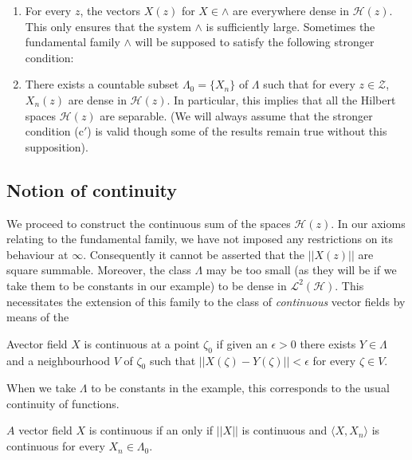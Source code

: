 \begin{enumerate}
\begin{enumerate}
\item For every $z$, the vectors $X(z)$ for $X\in \wedge$ are
  everywhere dense in $\mathscr{H}(z)$. This only ensures that the
  system $\wedge$ is sufficiently large. Sometimes the fundamental
  family $\wedge$ will be supposed to satisfy the following stronger
  condition: 

\setcounter{enumii}{2}
\renewcommand{\labelenumii}{(\theenumii$'$)}
\item There exists a countable subset $\Lambda_0 = \{X_n \}$
  of $\Lambda$ such that for every $z \in \mathcal{Z}$, $X_n (z)$ are
  dense in $\mathscr{H}(z)$. In particular, this implies that all the
  Hilbert spaces $\mathscr{H}(z)$ are separable. (We will always
  assume that the stronger condition (c$'$) is valid though some of
  the results remain true without this supposition). 
\end{enumerate}
\end{enumerate}

\subsection{Notion of continuity}\label{partIII-chap1-sec1.2}%

We proceed to construct the continuous sum of the spaces
$\mathscr{H}(z)$. In our axioms relating to the fundamental family, we
have not imposed any restrictions on its behaviour at
$\infty$. Consequently it cannot be asserted that the $|| X(z) ||$ are
square summable. Moreover, the class $\Lambda$ may be too small (as
they will be if we take them to be constants in our example) to be
dense in $\mathscr{L}^2(\mathscr{H})$. This necessitates the extension
of this family to the class of \textit{continuous} vector fields by
means of the  

\begin{defi*}
A\pageoriginale vector field $X$ is continuous at a point $\zeta_0$ if
  given an $\epsilon > 0$ there exists $Y \in \Lambda$ and a
  neighbourhood $V$ of 
  $\zeta_0$ such that $|| X(\zeta) - Y(\zeta) || < \epsilon$ for every
  $\zeta \in V$. 
\end{defi*}

\begin{remark*}
When we take $\Lambda$ to be constants in the example, this
corresponds to the usual continuity of functions. 
\end{remark*} 

\setcounter{proposition}{0}
\begin{proposition}\label{partIII-chap1-prop1}%
 $A$ vector field $X$ is continuous if an only if $|| X ||$ is
  continuous and $\langle X, X_n\rangle$ is continuous for every $X_n
  \in \Lambda_0$. 
\end{proposition}

